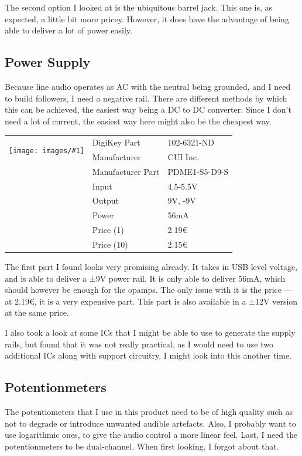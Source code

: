 \documentclass[a4paper]{article}
\makeatletter
\newenvironment{partdisplay}[1]{
\begin{center}
\begin{tabular}{@{}p{3cm}p{3cm}p{4.5cm}@{}}
\multirow{2}{3cm}{\texttt{[image: images/\#1]}}}{
\end{tabular}
\end{center}}
\makeatother
\begin{document}
The second option I looked at is the ubiquitous barrel jack. This one is, as expected, a little bit more pricey. However, it does have the advantage of being able to deliver a lot of power easily.

\subsection{Power Supply}

Because line audio operates as AC with the neutral being grounded, and I need to build followers, I need a negative rail. There are different methods by which this can be achieved, the easiest way being a DC to DC converter. Since I don't need a lot of current, the easiest way here might also be the cheapest way.

\begin{partdisplay}{MFG_PDME1-S}
& DigiKey Part & 102-6321-ND\\
& Manufacturer & CUI Inc.\\
& Manufacturer Part & PDME1-S5-D9-S\\
& Input & 4.5-5.5V\\
& Output & 9V, -9V\\
& Power & 56mA\\
& Price (1) & 2.19€\\
& Price (10) & 2.15€\\
\end{partdisplay}

The first part I found looks very promising already. It takes in USB level voltage, and is able to deliver a ±9V power rail. It is only able to deliver 56mA, which should however be enough for the opamps. The only issue with it is the price — at 2.19€, it is a very expensive part. This part is also available in a ±12V version at the same price.

I also took a look at some ICs that I might be able to use to generate the supply rails, but found that it was not really practical, as I would need to use two additional ICs along with support circuitry. I might look into this another time.

\subsection{Potentionmeters}

The potentiometers that I use in this product need to be of high quality such as not to degrade or introduce unwanted audible artefacts. Also, I probably want to use logarithmic ones, to give the audio control a more linear feel. Last, I need the potentionmeters to be dual-channel. When first looking, I forgot about that.
\end{document}
